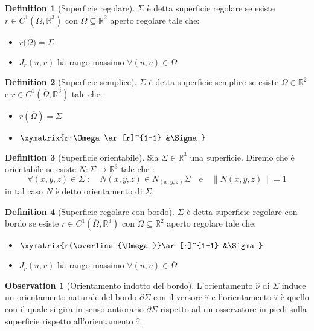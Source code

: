 \documentclass[leqno]{article}
\theoremstyle{definition}
\newtheorem{definition}{Definition}[section]
\numberwithin{equation}{section}
\newtheorem{observation}[theorem]{Observation}
\theoremstyle{remark}
\begin{document}
	\begin{definition}[Superficie regolare]
		$\Sigma$ è detta superficie regolare se esiste $r\in C^1(\overline{\Omega}, \mathbb{R}^3)$ con $\Omega \subseteq \mathbb{R}^2$ aperto regolare tale che:
		\begin{itemize}
			\item $r(\overline{\Omega)}=\Sigma$
			\item $J_r(u,v)$ ha rango massimo $\forall (u,v)\in \Omega$
		\end{itemize}
	\end{definition}
	
	\begin{definition}[Superficie semplice]
		$\Sigma$ è detta superficie semplice se esiste $\Omega \in \mathbb{R}^2$ e $r\in C^1(\overline{\Omega},\mathbb{R}^3)$ tale che:
		\begin{itemize}
			\item $r(\overline{\Omega})=\Sigma$
			\item $\xymatrix{r:\Omega \ar[r]^{1-1} &\Sigma}$
		\end{itemize}
	\end{definition}
	
	\begin{definition}[Superficie orientabile]
		Sia $\Sigma \in \mathbb{R}^3 $ una superficie. Diremo che è   orientabile se esiste $N:\Sigma \to \mathbb{R}^3$ tale che :
		\begin{equation}
			\forall(x,y,z)\in \Sigma \; : \quad N(x,y,z)\in N_{(x,y,z)}\Sigma \quad \text{e} \quad \lVert N(x,y,z) \rVert = 1
		\end{equation}
		in tal caso $N$ è detto orientamento di $\Sigma$.
	\end{definition}
	
	\begin{definition}[Superficie regolare con bordo]
		$\Sigma$ è detta superficie regolare con bordo se esiste $r\in C^1(\overline{\Omega}, \mathbb{R}^3)$ con $\Omega \subseteq \mathbb{R}^2$ aperto regolare tale che:
		\begin{itemize}
			\item $\xymatrix{r(\overline{\Omega)}\ar[r]^{1-1} &\Sigma}$
			\item $J_r(u,v)$ ha rango massimo $\forall (u,v)\in \overline{\Omega}$
		\end{itemize}
	\end{definition}
	
	\begin{observation}[Orientamento indotto del bordo]
		L'orientamento $\hat{\nu}$ di $\Sigma$ induce un orientamento naturale del bordo $\partial \Sigma$ con il versore $\hat{\tau}$ e l'orientamento $\hat{\tau}$ è quello con il quale si gira in senso antiorario $\partial\Sigma$ rispetto ad un osservatore in piedi sulla superficie rispetto all'orientamento $\hat{\tau}$.
	\end{observation}
	
\end{document}
